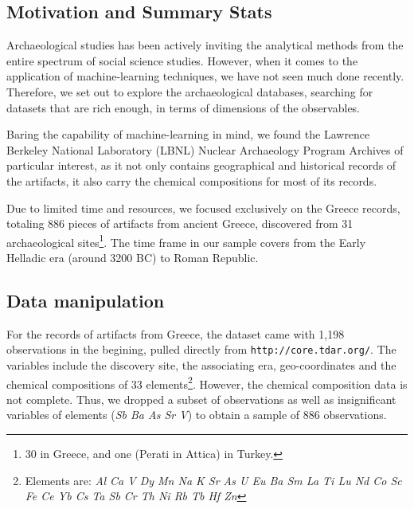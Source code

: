 \subsection{Motivation and Summary Stats}
Archaeological studies has been actively inviting the analytical methods from
the entire spectrum of social science studies. However, when it comes to the
application of machine-learning techniques, we have not seen much done recently.
Therefore, we set out to explore the archaeological databases, searching for
datasets that are rich enough, in terms of dimensions of the observables.

Baring the capability of machine-learning in mind, we found the 
Lawrence Berkeley National Laboratory (LBNL) Nuclear Archaeology Program
Archives %
of particular interest, as it not only contains geographical and historical
records of the artifacts, it also carry the chemical compositions for most of
its records.


Due to limited time and resources, we focused exclusively on the Greece records,
totaling 886 pieces of artifacts from ancient Greece, discovered from 31
archaeological sites\footnote{30 in Greece, and one (Perati in Attica) in
Turkey.}.  The time frame in our sample covers from the Early Helladic era
(around 3200 BC) to Roman Republic. 

\subsection{Data manipulation}
For the records of artifacts from Greece, the dataset came with 1,198
observations in the begining, pulled directly from \verb|http://core.tdar.org/|.
The variables include the discovery site, the associating era, geo-coordinates
and the chemical compositions of 33 elements\footnote{Elements are:
    \textit{Al Ca V Dy Mn Na K Sr As U Eu Ba Sm La Ti Lu Nd Co Sc Fe Ce Yb Cs Ta
    Sb Cr Th Ni Rb Tb Hf Zn}
}. However, the chemical composition
data is not complete. Thus, we dropped a subset of observations as well as
insignificant variables of elements (\textit{Sb Ba As Sr V}) to obtain a sample
of 886 observations. 


